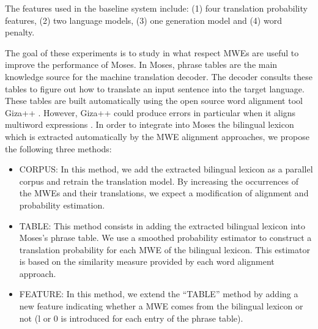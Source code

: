 \documentclass[output=paper,modfonts,nonflat]{langsci/langscibook}
\begin{document}
The features used in the baseline system include: (1) four translation probability features, (2) two language models, (3) one generation model and (4) word penalty. %

The goal of these experiments is to study in what respect MWEs are useful to improve the performance of Moses. In Moses, phrase tables are the main knowledge source for the machine translation decoder. The decoder consults these tables to figure out how to translate an input sentence into the target language. These tables are built automatically using the open source word alignment tool Giza++ \citep{och2000improved}. However, Giza++ could produce errors in particular when it aligns multiword expressions \citep{fraser2007measuring}. In order to integrate into Moses the bilingual lexicon which is extracted automatically by the MWE alignment approaches, we propose the following three methods:
\begin{itemize}
\item CORPUS: In this method, we add the extracted bilingual lexicon as a parallel corpus and retrain the translation model. By increasing the occurrences of the MWEs and their translations, we expect a modification of alignment and probability estimation.
 \item TABLE: This method consists in adding the extracted bilingual lexicon into Moses’s phrase table. We use a smoothed probability estimator to construct a translation probability for each MWE of the bilingual lexicon. This estimator is based on the similarity measure provided by each word alignment approach.
 \item FEATURE: In this method, we extend the ``TABLE'' method by adding a new feature indicating whether a MWE comes from the bilingual lexicon or not (l or 0 is introduced for each entry of the phrase table).
\end{itemize}
\end{document}
